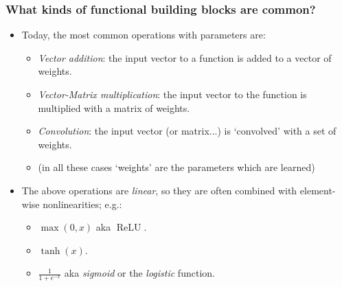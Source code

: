 \documentclass[]{article}
\DeclareMathOperator{\ReLU}{ReLU}
\begin{document}




\begin{frame}
\frametitle{What kinds of functional building blocks are common?}

\begin{itemize}
	\item<+-> Today, the most common operations with parameters are:
		\begin{itemize}
			\item \emph{Vector addition}: the input vector to a function is added to a vector of weights.
			\item \emph{Vector-Matrix multiplication}: the input vector to the function is multiplied with a matrix of weights.
			\item \emph{Convolution}: the input vector (or matrix...) is `convolved' with a set of weights.
			\item (in all these cases `weights' are the parameters which are learned)
		\end{itemize}
	\item<+-> The above operations are \emph{linear}, so they are often combined with element-wise nonlinearities; e.g.:
	\begin{itemize}
		\item $\max(0, x)$ aka $\ReLU$.
		\item $\tanh(x)$.
		\item $\frac{1}{1+e^{-x}}$ aka \emph{sigmoid} or the \emph{logistic} function. 
	\end{itemize}
\end{itemize}
\end{frame}
\end{document}
